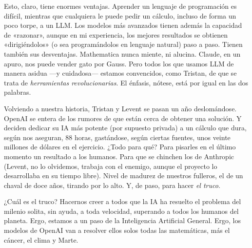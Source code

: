 \documentclass[11pt,a4paper]{article}
\begin{document}
Esto, claro, tiene enormes ventajas. Aprender un lenguaje de programación es difícil, mientras que cualquiera le puede pedir un cálculo, incluso de forma un poco torpe, a un LLM. Los modelos más avanzados tienen además la capacidad de «razonar», aunque en mi experiencia, los mejores resultados se obtienen «dirigiéndolos» (o sea programándolos en lenguaje natural) paso a paso. Tienen también sus desventajas. Mathematica nunca miente, ni alucina. Claude, en un apuro, nos puede vender gato por Gauss. Pero todos los que usamos LLM de manera asidua ---y cuidadosa--- estamos convencidos, como Tristan, de que se trata de \emph{herramientas revolucionarias}. El énfasis, nótese, está por igual en las dos palabras.

Volviendo a nuestra historia, Tristan y Levent se pasan un año deslomándose. OpenAI se entera de los rumores de que están cerca de obtener una solución. Y deciden dedicar su IA más potente (por supuesto privada) a un cálculo que dura, según nos aseguran, 88 horas, gastándose, según ciertas fuentes, unos veinte millones de dólares en el ejercicio. ¿Todo para qué? Para pisarles en el último momento un resultado a los humanos. Para que se chinchen los de Anthropic (Levent, no lo olvidemos, trabaja con el enemigo, aunque el proyecto lo desarrollaba en su tiempo libre). Nivel de madurez de nuestros fulleros, el de un chaval de doce años, tirando por lo alto. Y, de paso, para hacer \emph{el truco}.

¿Cuál es el truco? Hacernos creer a todos que la IA ha resuelto el problema del milenio solita, sin ayuda, a toda velocidad, superando a todos los humanos del planeta. Ergo, estamos a un paso de la Inteligencia Artificial General. Ergo, los modelos de OpenAI van a resolver ellos solos todas las matemáticas, más el cáncer, el clima y Marte.
\end{document}
